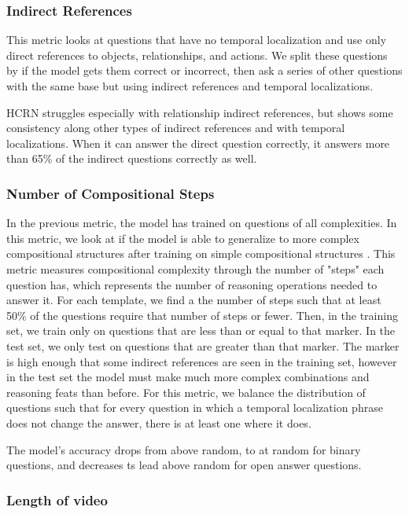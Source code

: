 \documentclass[10pt,twocolumn,letterpaper]{article}
\begin{document}
\subsubsection{Indirect References}

This metric looks at questions that have  no temporal localization and use only direct references to objects, relationships, and actions. We split these questions by if the model gets them correct or incorrect, then ask a series of other questions with the same base but using indirect references and temporal localizations. 

HCRN struggles especially with relationship indirect references, but shows some consistency along other types of indirect references and with temporal localizations. When it can answer the direct question correctly, it answers more than 65\% of the indirect questions correctly as well. 

\subsubsection{Number of Compositional Steps}

In the previous metric, the model has trained on questions of all complexities. In this metric, we look at if the model is able to generalize to more complex compositional structures after training on simple compositional structures \cite{lake2018generalization}. This metric measures compositional complexity through the number of "steps" each question has, which represents the number of reasoning operations needed to answer it. For each template, we find a the number of steps such that at least 50\% of the questions require that number of steps or fewer. Then, in the training set, we train only on questions that are less than or equal to that marker. In the test set, we only test on questions that are greater than that marker. The marker is high enough that some indirect references are seen in the training set, however in the test set the model must make much more complex combinations and reasoning feats than before. For this metric, we balance the distribution of questions such that for every question in which a temporal localization phrase does not change the answer, there is at least one where it does.

The model's accuracy drops from above random, to at random for binary questions, and decreases ts lead above random for open answer questions.


\subsubsection{Length of video}
\end{document}
